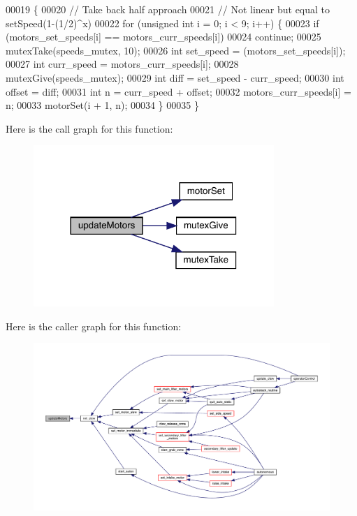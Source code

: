 \begin{DoxyCode}
00019                     \{
00020   \textcolor{comment}{// Take back half approach}
00021   \textcolor{comment}{// Not linear but equal to setSpeed(1-(1/2)^x)}
00022   \textcolor{keywordflow}{for} (\textcolor{keywordtype}{unsigned} \textcolor{keywordtype}{int} i = 0; i < 9; i++) \{
00023     \textcolor{keywordflow}{if} (motors_set_speeds[i] == motors_curr_speeds[i])
00024       \textcolor{keywordflow}{continue};
00025     mutexTake(speeds_mutex, 10);
00026     \textcolor{keywordtype}{int} set\_speed = (motors_set_speeds[i]);
00027     \textcolor{keywordtype}{int} curr\_speed = motors_curr_speeds[i];
00028     mutexGive(speeds_mutex);
00029     \textcolor{keywordtype}{int} diff = set\_speed - curr\_speed;
00030     \textcolor{keywordtype}{int} offset = diff;
00031     \textcolor{keywordtype}{int} n = curr\_speed + offset;
00032     motors_curr_speeds[i] = n;
00033     motorSet(i + 1, n);
00034   \}
00035 \}
\end{DoxyCode}
Here is the call graph for this function\+:
\nopagebreak
\begin{figure}[H]
\begin{center}
\leavevmode
\includegraphics[width=258pt]{slew_8c_a807a87c5df438fde21c1e8213906695b_cgraph}
\end{center}
\end{figure}
Here is the caller graph for this function\+:
\nopagebreak
\begin{figure}[H]
\begin{center}
\leavevmode
\includegraphics[width=350pt]{slew_8c_a807a87c5df438fde21c1e8213906695b_icgraph}
\end{center}
\end{figure}


